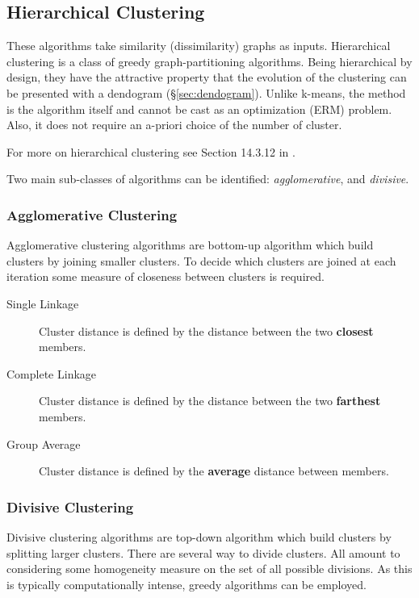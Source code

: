 \subsection{Hierarchical Clustering}
\label{sec:hierarchical}

These algorithms take similarity (dissimilarity) graphs as inputs.
Hierarchical clustering is a class of greedy graph-partitioning algorithms. 
Being hierarchical by design, they have the attractive property that the evolution of the clustering can be presented with a dendogram (\S\ref{sec:dendogram}).  
Unlike k-means, the method is the algorithm itself and cannot be cast as an optimization (ERM) problem.
Also, it does not require an a-priori choice of the number of cluster.

For more on hierarchical clustering see Section 14.3.12 in \cite{hastie_elements_2003}.

Two main sub-classes of algorithms can be identified: \emph{agglomerative}, and \emph{divisive}.
\subsubsection{Agglomerative Clustering}
Agglomerative clustering algorithms are bottom-up algorithm which build clusters by joining smaller clusters. 
To decide which clusters are joined at each iteration some measure of closeness between clusters is required. 
\begin{description}
\item[Single Linkage] Cluster distance is defined by the distance between the two \textbf{closest} members.
\item[Complete Linkage] Cluster distance is defined by the distance between the two \textbf{farthest} members.
\item[Group Average] Cluster distance is defined by the \textbf{average} distance between members.
\end{description}


\subsubsection{Divisive Clustering}
Divisive clustering algorithms are top-down algorithm which build clusters by splitting larger clusters. 
There are several way to divide clusters. All amount to considering some homogeneity measure on the set of all possible divisions. As this is typically computationally intense, greedy algorithms can be employed.












